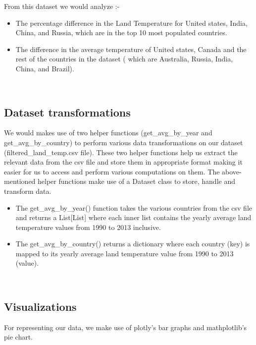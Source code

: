 \documentclass[a4paper, 11pt]{report}
\begin{document}
From this dataset we would analyze :-

\begin{itemize}
    \item The percentage difference in the Land Temperature for United states, India,  China, and Russia, which are in the top 10 most populated countries.

    \item The difference in the average temperature of United states, Canada and the rest of the countries in the dataset ( which are Australia, Russia, India, China, and Brazil).
\end{itemize}
~\\
\subsection{Dataset transformations}

We would makes use of two helper functions (get\_avg\_by\_year and get\_avg\_by\_country) to perform various data transformations on our dataset (filtered\_land\_temp.csv file). These two helper functions help us extract the relevant data from the csv file and store them in appropriate format making it easier for us to access and perform various computations on them. The above-mentioned helper functions make use of a Dataset class to store, handle and transform data.

\begin{itemize}
    \item The get\_avg\_by\_year() function takes the various countries from the csv file and returns a List[List] where each inner list contains the yearly average land temperature values from 1990 to 2013 inclusive.

    \item The get\_avg\_by\_country() returns a dictionary where each country (key) is mapped to its yearly average land temperature value from 1990 to 2013 (value).
\end{itemize}
~\\

\subsection{Visualizations}

For representing our data, we make use of plotly’s bar graphs and mathplotlib’s pie chart.
\end{document}
